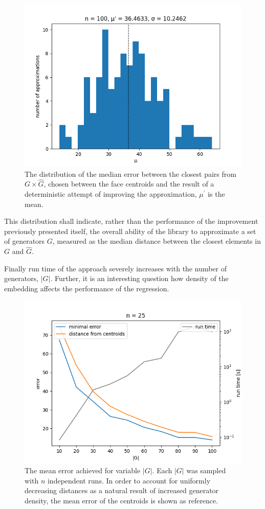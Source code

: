 \documentclass[a4paper]{article}
\begin{document}
\begin{figure}[H]
	\includegraphics[width=\textwidth]{approximation_performance.png}
	\caption{The distribution of the median error between the closest pairs from \(G \times \hat{G}\),
		chosen between the face centroids and the result of a deterministic attempt of improving the approximation,
		\(\mu^\prime\) is the mean.}
\end{figure}

This distribution shall indicate, rather than the performance of the improvement previously presented itself, the
overall ability of the library to approximate a set of generators \(G\), measured as the median distance between
the closest elements in \(G\) and \(\hat{G}\).

Finally run time of the approach severely increases with the number of generators, \(|G|\). Further,
it is an interesting question how density of the embedding affects the performance of the regression.

\begin{figure}[H]
	\includegraphics[width=\textwidth]{approximation_generator_density.png}
	\caption{The mean error achieved for variable \(|G|\). Each \(|G|\) was sampled with \(n\) independent runs.
		In order to account for uniformly decreasing distances as a natural result of increased generator density,
		the mean error of the centroids is shown as reference.}
\end{figure}
\end{document}
